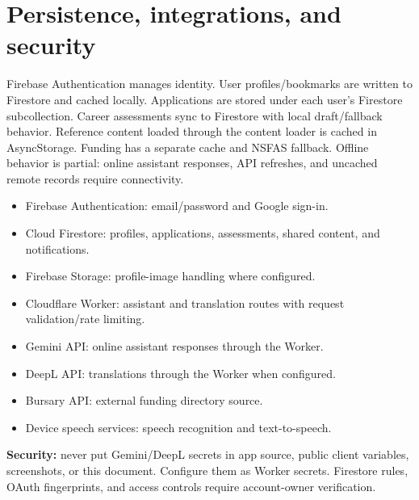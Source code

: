 \documentclass[11pt,a4paper]{article}
\begin{document}
\section{Persistence, integrations, and security}
Firebase Authentication manages identity. User profiles/bookmarks are written to Firestore and cached locally. Applications are stored under each user's Firestore subcollection. Career assessments sync to Firestore with local draft/fallback behavior. Reference content loaded through the content loader is cached in AsyncStorage. Funding has a separate cache and NSFAS fallback. Offline behavior is partial: online assistant responses, API refreshes, and uncached remote records require connectivity.
\begin{itemize}
\item Firebase Authentication: email/password and Google sign-in.
\item Cloud Firestore: profiles, applications, assessments, shared content, and notifications.
\item Firebase Storage: profile-image handling where configured.
\item Cloudflare Worker: assistant and translation routes with request validation/rate limiting.
\item Gemini API: online assistant responses through the Worker.
\item DeepL API: translations through the Worker when configured.
\item Bursary API: external funding directory source.
\item Device speech services: speech recognition and text-to-speech.
\end{itemize}
\textbf{Security:} never put Gemini/DeepL secrets in app source, public client variables, screenshots, or this document. Configure them as Worker secrets. Firestore rules, OAuth fingerprints, and access controls require account-owner verification.
\end{document}
